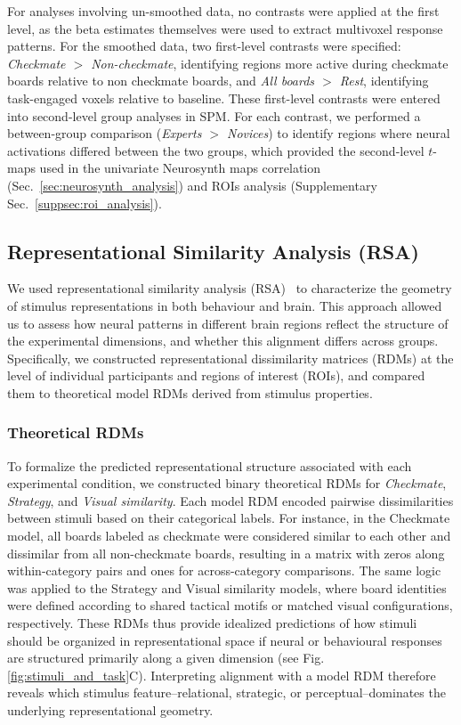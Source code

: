 \documentclass[preprint,12pt]{elsarticle}
\begin{document}
For analyses involving un-smoothed data, no contrasts were applied at the first level, as the beta estimates themselves were used to extract multivoxel response patterns. For the smoothed data, two first-level contrasts were specified: \emph{Checkmate $>$ Non-checkmate}, identifying regions more active during checkmate boards relative to non checkmate boards, and \emph{All boards $>$ Rest}, identifying task-engaged voxels relative to baseline. These first-level contrasts were entered into second-level group analyses in SPM. For each contrast, we performed a between-group comparison (\emph{Experts $>$ Novices}) to identify regions where neural activations differed between the two groups, which provided the second-level $t$-maps used in the univariate Neurosynth maps correlation (Sec.~\ref{sec:neurosynth_analysis}) and ROIs analysis (Supplementary Sec.~\ref{suppsec:roi_analysis}).

\subsection{Representational Similarity Analysis (RSA)}
We used representational similarity analysis (RSA)~\cite{Kriegeskorte2008} to characterize the geometry of stimulus representations in both behaviour and brain. This approach allowed us to assess how neural patterns in different brain regions reflect the structure of the experimental dimensions, and whether this alignment differs across groups. Specifically, we constructed representational dissimilarity matrices (RDMs) at the level of individual participants and regions of interest (ROIs), and compared them to theoretical model RDMs derived from stimulus properties.

\subsubsection{Theoretical RDMs}\label{sec:model_rdms}
To formalize the predicted representational structure associated with each experimental condition, we constructed binary theoretical RDMs for \emph{Checkmate}, \emph{Strategy}, and \emph{Visual similarity}. Each model RDM encoded pairwise dissimilarities between stimuli based on their categorical labels. For instance, in the Checkmate model, all boards labeled as checkmate were considered similar to each other and dissimilar from all non-checkmate boards, resulting in a matrix with zeros along within-category pairs and ones for across-category comparisons. The same logic was applied to the Strategy and Visual similarity models, where board identities were defined according to shared tactical motifs or matched visual configurations, respectively. These RDMs thus provide idealized predictions of how stimuli should be organized in representational space if neural or behavioural responses are structured primarily along a given dimension (see Fig. \ref{fig:stimuli_and_task}C). Interpreting alignment with a model RDM therefore reveals which stimulus feature--relational, strategic, or perceptual--dominates the underlying representational geometry.
\end{document}
